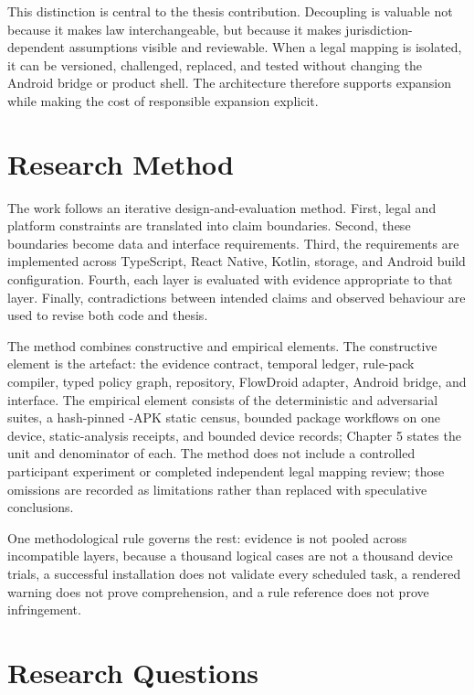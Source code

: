 This distinction is central to the thesis contribution. Decoupling is valuable not because it makes law interchangeable, but because it makes jurisdiction-dependent assumptions visible and reviewable. When a legal mapping is isolated, it can be versioned, challenged, replaced, and tested without changing the Android bridge or product shell. The architecture therefore supports expansion while making the cost of responsible expansion explicit.

\section{Research Method}

The work follows an iterative design-and-evaluation method. First, legal and platform constraints are translated into claim boundaries. Second, these boundaries become data and interface requirements. Third, the requirements are implemented across TypeScript, React Native, Kotlin, storage, and Android build configuration. Fourth, each layer is evaluated with evidence appropriate to that layer. Finally, contradictions between intended claims and observed behaviour are used to revise both code and thesis.

The method combines constructive and empirical elements. The constructive element is the artefact: the evidence contract, temporal ledger, rule-pack compiler, typed policy graph, repository, FlowDroid adapter, Android bridge, and interface. The empirical element consists of the deterministic and adversarial suites, a hash-pinned \FDroidCensusN{}-APK static census, \DevicePackagesN{} bounded package workflows on one device, static-analysis receipts, and bounded device records; Chapter 5 states the unit and denominator of each. The method does not include a controlled participant experiment or completed independent legal mapping review; those omissions are recorded as limitations rather than replaced with speculative conclusions.

One methodological rule governs the rest: evidence is not pooled across incompatible layers, because a thousand logical cases are not a thousand device trials, a successful installation does not validate every scheduled task, a rendered warning does not prove comprehension, and a rule reference does not prove infringement.

\section{Research Questions}

